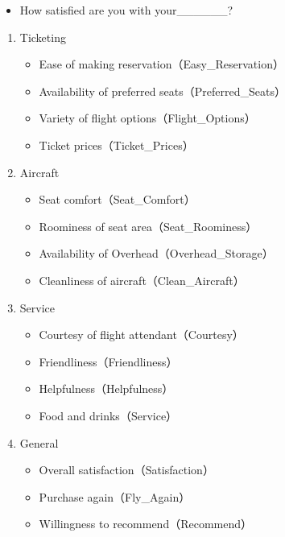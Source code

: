 \documentclass[12pt,]{krantz}
\providecommand{\tightlist}{%
  \setlength{\itemsep}{0pt}\setlength{\parskip}{0pt}}
\theoremstyle{definition}
\theoremstyle{definition}
\theoremstyle{remark}
\begin{document}
\begin{itemize}
\tightlist
\item
  How satisfied are you with your\_\_\_\_\_\_?
\end{itemize}

\begin{enumerate}
\def\labelenumi{\arabic{enumi}.}
\tightlist
\item
  Ticketing

  \begin{itemize}
  \tightlist
  \item
    Ease of making reservation（Easy\_Reservation）
  \item
    Availability of preferred seats（Preferred\_Seats）
  \item
    Variety of flight options（Flight\_Options）
  \item
    Ticket prices（Ticket\_Prices）
  \end{itemize}
\item
  Aircraft

  \begin{itemize}
  \tightlist
  \item
    Seat comfort（Seat\_Comfort）
  \item
    Roominess of seat area（Seat\_Roominess）
  \item
    Availability of Overhead（Overhead\_Storage）
  \item
    Cleanliness of aircraft（Clean\_Aircraft）
  \end{itemize}
\item
  Service

  \begin{itemize}
  \tightlist
  \item
    Courtesy of flight attendant（Courtesy）
  \item
    Friendliness（Friendliness）
  \item
    Helpfulness（Helpfulness）
  \item
    Food and drinks（Service）
  \end{itemize}
\item
  General

  \begin{itemize}
  \tightlist
  \item
    Overall satisfaction（Satisfaction）
  \item
    Purchase again（Fly\_Again）
  \item
    Willingness to recommend（Recommend）
  \end{itemize}
\end{enumerate}
\end{document}
